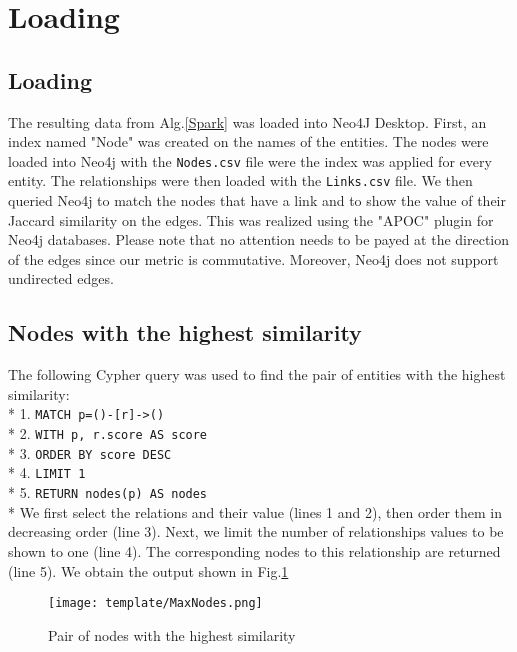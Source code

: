 \documentclass[sigconf]{acmart}
\begin{document}
\section{Loading}
\subsection{Loading}
The resulting data from Alg.\ref{Spark} was loaded into Neo4J Desktop. First, an index named "Node" was created on the names of the entities. The nodes were loaded into Neo4j with the \texttt{Nodes.csv} file were the index was applied for every entity. The relationships were then loaded with the \texttt{Links.csv} file. We then queried Neo4j to match the nodes that have a link and to show the value of their Jaccard similarity on the edges. This was realized using the "APOC" plugin for Neo4j databases. Please note that no attention needs to be payed at the direction of the edges since our metric is commutative. Moreover, Neo4j does not support undirected edges.
\subsection{Nodes with the highest similarity}
The following Cypher query was used to find the pair of entities with the highest similarity:\\*
1. \texttt{MATCH p=()-[r]->()}\\*
2. \texttt{WITH p, r.score AS score}\\*
3. \texttt{ORDER BY score DESC}\\*
4. \texttt{LIMIT 1}\\*
5. \texttt{RETURN nodes(p) AS nodes}\\*
We first select the relations and their value (lines 1 and 2), then order them in decreasing order (line 3). Next, we limit the number of relationships values to be shown to one (line 4). The corresponding nodes to this relationship are returned (line 5). We obtain the output shown in Fig.\ref{HighSim}
\begin{figure}[H]
    \centering
    \texttt{[image: template/MaxNodes.png]}
    \vspace*{-4mm}
    \caption{Pair of nodes with the highest similarity}
    \label{HighSim}
\end{figure}
\end{document}
